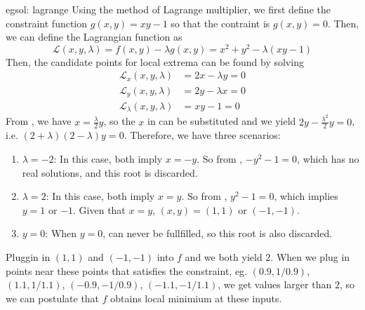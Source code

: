 \begin{egsol}[]{egsol: lagrange}
    Using the method of Lagrange multiplier, we first define the constraint function $g(x,y) = xy - 1$ so that the contraint is $g(x,y) = 0$.  Then, we can define the Lagrangian function as 
    \[\mathcal{L}(x,y,\lambda) = f(x,y) - \lambda g(x,y) = x^2 + y^2 - \lambda(xy-1)\]
    Then, the candidate points for local extrema can be found by solving
    \begin{align}
        \mathcal{L}_x(x,y,\lambda) &= 2x - \lambda y = 0 \label{eq: lagrange_x}\\
        \mathcal{L}_y(x,y,\lambda) &= 2y - \lambda x = 0 \label{eq: lagrange_y}\\
        \mathcal{L}_\lambda(x,y,\lambda) &= xy-1 = 0 \label{eq: lagrange_l}
    \end{align}
    From , we have $x = \frac{\lambda}{2}y$, so the $x$ in  can be substituted and we yield $2y - \frac{\lambda^2}{2}y = 0$, i.e. $(2+\lambda)(2-\lambda)y = 0$.  Therefore, we have three scenarios:
    \begin{enumerate}
        \item $\lambda = -2$: In this case, both  imply $x = -y$.  So from , $-y^2-1=0$, which has no real solutions, and this root is discarded.
        \item $\lambda = 2$: In this case, both  imply $x = y$.  So from , $y^2-1=0$, which implies $y = 1$ or $-1$.  Given that $x = y$,  $(x,y) = (1,1)$ or $(-1,-1)$.
        \item $y=0$: When $y=0$,  can never be fullfilled, so this root is also discarded.
    \end{enumerate}
    Pluggin in $(1,1)$ and $(-1,-1)$ into $f$ and we both yield $2$.  When we plug in points near these points that satisfies the constraint, eg. $(0.9, 1/0.9)$, $(1.1, 1/1.1)$, $(-0.9, -1/0.9)$, $(-1.1, -1/1.1)$, we get values larger than $2$, so we can postulate that $f$ obtains local minimium at these inputs.
 \end{egsol}